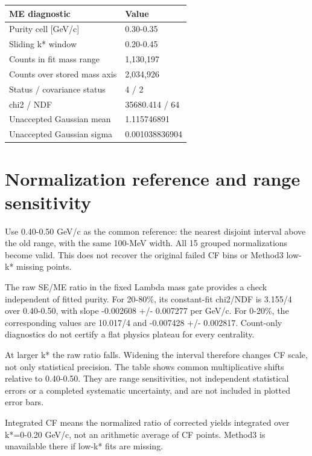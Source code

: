 \documentclass[10pt,a4paper]{article}
\begin{document}
{\small\setlength{\tabcolsep}{3pt}\begin{longtable}{ll}\toprule
ME diagnostic & Value\\\midrule\endhead
Purity cell [GeV/c] & 0.30-0.35\\
Sliding k* window & 0.20-0.45\\
Counts in fit mass range & 1,130,197\\
Counts over stored mass axis & 2,034,926\\
Status / covariance status & 4 / 2\\
chi2 / NDF & 35680.414 / 64\\
Unaccepted Gaussian mean & 1.115746891\\
Unaccepted Gaussian sigma & 0.001038836904\\
\bottomrule\end{longtable}}
\clearpage
\section*{Normalization reference and range sensitivity}
Use 0.40-0.50 GeV/c as the common reference: the nearest disjoint interval above the old range, with the same 100-MeV width. All 15 grouped normalizations become valid. This does not recover the original failed CF bins or Method3 low-k* missing points.

The raw SE/ME ratio in the fixed Lambda mass gate provides a check independent of fitted purity. For 20-80\%, its constant-fit chi2/NDF is 3.155/4 over 0.40-0.50, with slope -0.002608 +/- 0.007277 per GeV/c. For 0-20\%, the corresponding values are 10.017/4 and -0.007428 +/- 0.002817. Count-only diagnostics do not certify a flat physics plateau for every centrality.

At larger k* the raw ratio falls. Widening the interval therefore changes CF scale, not only statistical precision. The table shows common multiplicative shifts relative to 0.40-0.50. They are range sensitivities, not independent statistical errors or a completed systematic uncertainty, and are not included in plotted error bars.

Integrated CF means the normalized ratio of corrected yields integrated over k*=0-0.20 GeV/c, not an arithmetic average of CF points. Method3 is unavailable there if low-k* fits are missing.
\end{document}
